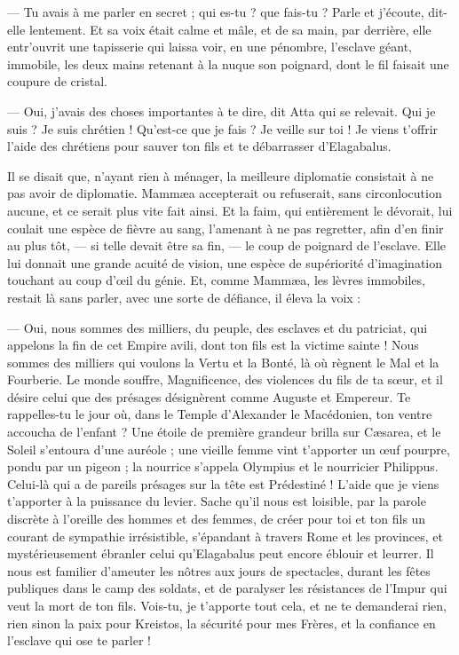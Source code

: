 \documentclass[a4paper, 11pt, oneside, polutonikogreek, french]{article}
\begin{document}
--- Tu avais à me parler en secret ; qui es-tu ? que fais-tu ? Parle et j'écoute, dit-elle lentement. Et sa voix était calme et mâle, et de sa main, par derrière, elle entr'ouvrit une tapisserie qui laissa voir, en une pénombre, l'esclave géant, immobile, les deux mains retenant à la nuque son poignard, dont le fil faisait une coupure de cristal.

--- Oui, j'avais des choses importantes à te dire, dit Atta qui se relevait. Qui je suis ? Je suis chrétien ! Qu'est-ce que je fais ? Je veille sur toi ! Je viens t'offrir l'aide des chrétiens pour sauver ton fils et te débarrasser d'Elagabalus.

Il se disait que, n'ayant rien à ménager, la meilleure diplomatie consistait à ne pas avoir de diplomatie. Mammæa accepterait ou refuserait, sans circonlocution aucune, et ce serait plus vite fait ainsi. Et la faim, qui entièrement le dévorait, lui coulait une espèce de fièvre au sang, l'amenant à ne pas regretter, afin d'en finir au plus tôt, --- si telle devait être sa fin, --- le coup de poignard de l'esclave. Elle lui donnait une grande acuité de vision, une espèce de supériorité d'imagination touchant au coup d'œil du génie. Et, comme Mammæa, les lèvres immobiles, restait là sans parler, avec une sorte de défiance, il éleva la voix :

--- Oui, nous sommes des milliers, du peuple, des esclaves et du patriciat, qui appelons la fin de cet Empire avili, dont ton fils est la victime sainte ! Nous sommes des milliers qui voulons la Vertu et la Bonté, là où règnent le Mal et la Fourberie. Le monde souffre, Magnificence, des violences du fils de ta sœur, et il désire celui que des présages désignèrent comme Auguste et Empereur. Te rappelles-tu le jour où, dans le Temple d'Alexander le Macédonien, ton ventre accoucha de l’enfant ? Une étoile de première grandeur brilla sur Cæsarea, et le Soleil s'entoura d'une auréole ; une vieille femme vint t'apporter un œuf pourpre, pondu par un pigeon ; la nourrice s'appela Olympius et le nourricier Philippus. Celui-là qui a de pareils présages sur la tête est Prédestiné ! L'aide que je viens t'apporter à la puissance du levier. Sache qu'il nous est loisible, par la parole discrète à l'oreille des hommes et des femmes, de créer pour toi et ton fils un courant de sympathie irrésistible, s'épandant à travers Rome et les provinces, et mystérieusement ébranler celui qu'Elagabalus peut encore éblouir et leurrer. Il nous est familier d'ameuter les nôtres aux jours de spectacles, durant les fêtes publiques dans le camp des soldats, et de paralyser les résistances de l'Impur qui veut la mort de ton fils. Vois-tu, je t'apporte tout cela, et ne te demanderai rien, rien sinon la paix pour Kreistos, la sécurité pour mes Frères, et la confiance en l'esclave qui ose te parler !
\end{document}
